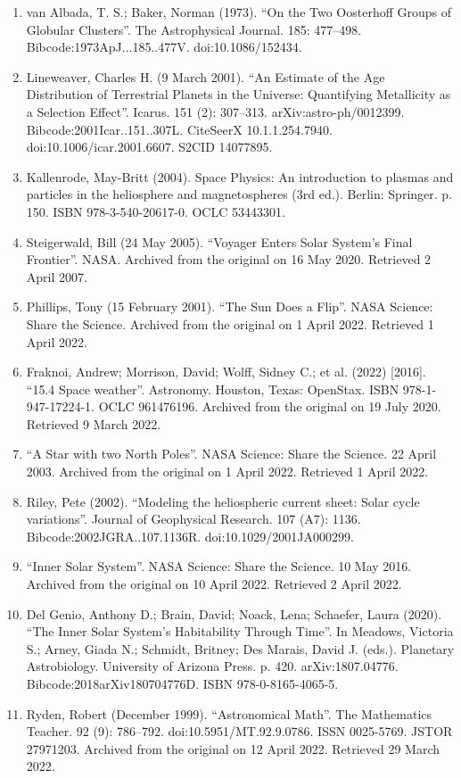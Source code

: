 \begin{enumerate}
\item van Albada, T. S.; Baker, Norman (1973). ``On the Two Oosterhoff Groups of Globular Clusters''. The Astrophysical Journal. 185: 477–498. Bibcode:1973ApJ...185..477V. doi:10.1086/152434.
\item Lineweaver, Charles H. (9 March 2001). ``An Estimate of the Age Distribution of Terrestrial Planets in the Universe: Quantifying Metallicity as a Selection Effect''. Icarus. 151 (2): 307–313. arXiv:astro-ph/0012399. Bibcode:2001Icar..151..307L. CiteSeerX 10.1.1.254.7940. doi:10.1006/icar.2001.6607. S2CID 14077895.
\item Kallenrode, May-Britt (2004). Space Physics: An introduction to plasmas and particles in the heliosphere and magnetospheres (3rd ed.). Berlin: Springer. p. 150. ISBN 978-3-540-20617-0. OCLC 53443301.
\item Steigerwald, Bill (24 May 2005). ``Voyager Enters Solar System's Final Frontier''. NASA. Archived from the original on 16 May 2020. Retrieved 2 April 2007.
\item Phillips, Tony (15 February 2001). ``The Sun Does a Flip''. NASA Science: Share the Science. Archived from the original on 1 April 2022. Retrieved 1 April 2022.
\item Fraknoi, Andrew; Morrison, David; Wolff, Sidney C.; et al. (2022) [2016]. ``15.4 Space weather''. Astronomy. Houston, Texas: OpenStax. ISBN 978-1-947-17224-1. OCLC 961476196. Archived from the original on 19 July 2020. Retrieved 9 March 2022.
\item ``A Star with two North Poles''. NASA Science: Share the Science. 22 April 2003. Archived from the original on 1 April 2022. Retrieved 1 April 2022.
\item Riley, Pete (2002). ``Modeling the heliospheric current sheet: Solar cycle variations''. Journal of Geophysical Research. 107 (A7): 1136. Bibcode:2002JGRA..107.1136R. doi:10.1029/2001JA000299.
\item ``Inner Solar System''. NASA Science: Share the Science. 10 May 2016. Archived from the original on 10 April 2022. Retrieved 2 April 2022.
\item Del Genio, Anthony D.; Brain, David; Noack, Lena; Schaefer, Laura (2020). ``The Inner Solar System's Habitability Through Time''. In Meadows, Victoria S.; Arney, Giada N.; Schmidt, Britney; Des Marais, David J. (eds.). Planetary Astrobiology. University of Arizona Press. p. 420. arXiv:1807.04776. Bibcode:2018arXiv180704776D. ISBN 978-0-8165-4065-5.
\item Ryden, Robert (December 1999). ``Astronomical Math''. The Mathematics Teacher. 92 (9): 786–792. doi:10.5951/MT.92.9.0786. ISSN 0025-5769. JSTOR 27971203. Archived from the original on 12 April 2022. Retrieved 29 March 2022.

\end{enumerate}
